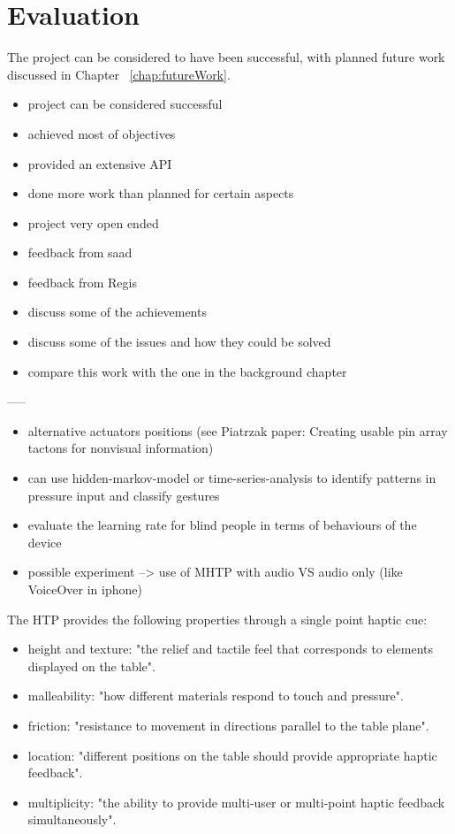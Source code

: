 \chapter{Evaluation}

The project can be considered to have been successful, with planned future work discussed in Chapter ~\ref{chap:futureWork}.


\begin{itemize}
	\item project can be considered successful
    \item achieved most of objectives
    \item provided an extensive API
    \item done more work than planned for certain aspects
    \item project very open ended
    \item feedback from saad
    \item feedback from Regis
    \item discuss some of the achievements
    \item discuss some of the issues and how they could be solved
    \item compare this work with the one in the background chapter
\end{itemize}


-----

\begin{itemize}
    \item alternative actuators positions (see Piatrzak paper: Creating usable pin array tactons for nonvisual information)
    \item can use hidden-markov-model or time-series-analysis to identify patterns in pressure input and classify gestures
    \item evaluate the learning rate for blind people in terms of behaviours of the device
    \item possible experiment --> use of MHTP with audio VS audio only (like VoiceOver in iphone)
\end{itemize}

The HTP provides the following properties through a single point haptic cue:
\begin{itemize}
	\item height and texture: "the relief and tactile feel that corresponds to elements displayed on the table".
    \item malleability: "how different materials respond to touch and pressure".
    \item friction: "resistance to movement in directions parallel to the table plane".
    \item location: "different positions on the table should provide appropriate haptic feedback".
    \item multiplicity: "the ability to provide multi-user or multi-point haptic feedback simultaneously". \cite{marquardt2009haptic}
\end{itemize}

